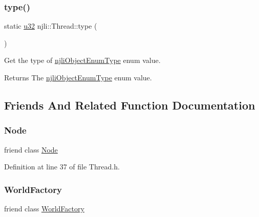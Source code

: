 \mbox{\label{classnjli_1_1_thread_ae805bd8ca1582bfe6da7c73516c76d6d}} 
\subsubsection{\texorpdfstring{type()}{type()}}
{\footnotesize\ttfamily static \mbox{\hyperlink{_util_8h_a10e94b422ef0c20dcdec20d31a1f5049}{u32}} njli\+::\+Thread\+::type (\begin{DoxyParamCaption}{ }\end{DoxyParamCaption})\hspace{0.3cm}{\ttfamily [static]}}

Get the type of \mbox{\hyperlink{namespacenjli_a6d56d4fbaf89fcf3e3d32839df05b444}{njli\+Object\+Enum\+Type}} enum value.

\begin{DoxyReturn}{Returns}
The \mbox{\hyperlink{namespacenjli_a6d56d4fbaf89fcf3e3d32839df05b444}{njli\+Object\+Enum\+Type}} enum value. 
\end{DoxyReturn}


\subsection{Friends And Related Function Documentation}
\mbox{\label{classnjli_1_1_thread_a6db9d28bd448a131448276ee03de1e6d}} 
\subsubsection{\texorpdfstring{Node}{Node}}
{\footnotesize\ttfamily friend class \mbox{\hyperlink{classnjli_1_1_node}{Node}}\hspace{0.3cm}{\ttfamily [friend]}}



Definition at line 37 of file Thread.\+h.

\mbox{\label{classnjli_1_1_thread_acb96ebb09abe8f2a37a915a842babfac}} 
\subsubsection{\texorpdfstring{World\+Factory}{WorldFactory}}
{\footnotesize\ttfamily friend class \mbox{\hyperlink{classnjli_1_1_world_factory}{World\+Factory}}\hspace{0.3cm}{\ttfamily [friend]}}



